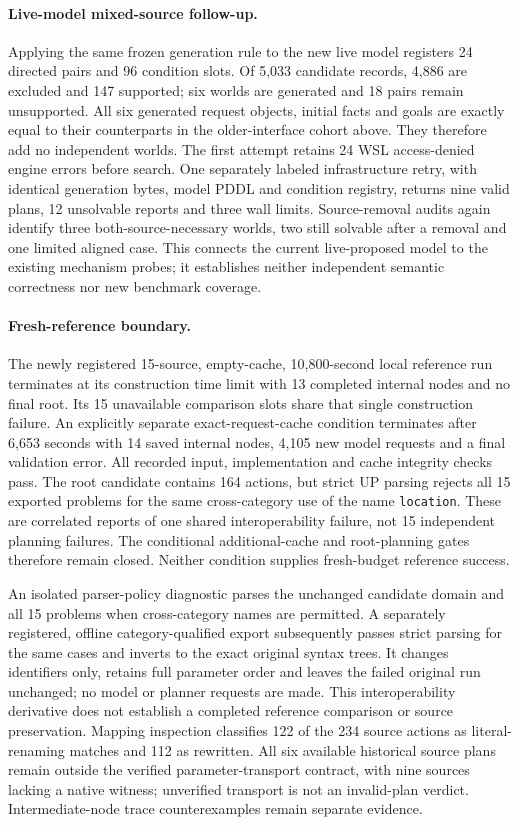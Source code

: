 \documentclass[letterpaper]{article}
\begin{document}
\paragraph{Live-model mixed-source follow-up.}
Applying the same frozen generation rule to the new live model registers 24 directed pairs and 96 condition slots. Of 5,033 candidate records, 4,886 are excluded and 147 supported; six worlds are generated and 18 pairs remain unsupported. All six generated request objects, initial facts and goals are exactly equal to their counterparts in the older-interface cohort above. They therefore add no independent worlds. The first attempt retains 24 WSL access-denied engine errors before search. One separately labeled infrastructure retry, with identical generation bytes, model PDDL and condition registry, returns nine valid plans, 12 unsolvable reports and three wall limits. Source-removal audits again identify three both-source-necessary worlds, two still solvable after a removal and one limited aligned case. This connects the current live-proposed model to the existing mechanism probes; it establishes neither independent semantic correctness nor new benchmark coverage.

\paragraph{Fresh-reference boundary.}
The newly registered 15-source, empty-cache, 10,800-second local reference run terminates at its construction time limit with 13 completed internal nodes and no final root. Its 15 unavailable comparison slots share that single construction failure. An explicitly separate exact-request-cache condition terminates after 6,653 seconds with 14 saved internal nodes, 4,105 new model requests and a final validation error. All recorded input, implementation and cache integrity checks pass. The root candidate contains 164 actions, but strict UP parsing rejects all 15 exported problems for the same cross-category use of the name \texttt{location}. These are correlated reports of one shared interoperability failure, not 15 independent planning failures. The conditional additional-cache and root-planning gates therefore remain closed. Neither condition supplies fresh-budget reference success.

An isolated parser-policy diagnostic parses the unchanged candidate domain and all 15 problems when cross-category names are permitted. A separately registered, offline category-qualified export subsequently passes strict parsing for the same cases and inverts to the exact original syntax trees. It changes identifiers only, retains full parameter order and leaves the failed original run unchanged; no model or planner requests are made. This interoperability derivative does not establish a completed reference comparison or source preservation. Mapping inspection classifies 122 of the 234 source actions as literal-renaming matches and 112 as rewritten. All six available historical source plans remain outside the verified parameter-transport contract, with nine sources lacking a native witness; unverified transport is not an invalid-plan verdict. Intermediate-node trace counterexamples remain separate evidence.
\end{document}
